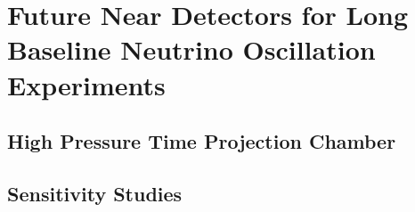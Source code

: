\chapter{Future Near Detectors for Long Baseline Neutrino Oscillation Experiments}\label{sec:HPTPC}
\section{High Pressure Time Projection Chamber}
\section{Sensitivity Studies}
\newpage